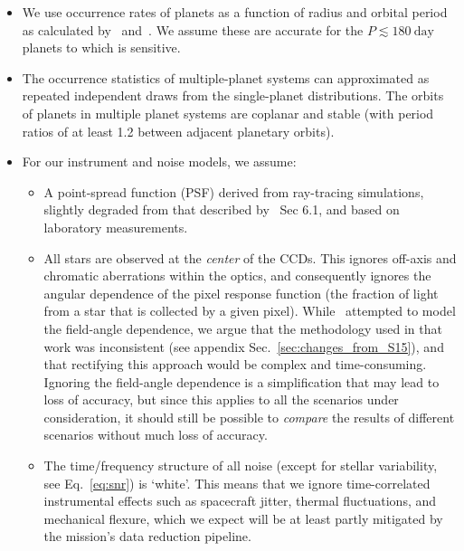 \begin{itemize}
	\item We use occurrence rates of planets as a function of radius
          and orbital period as calculated by~\citet{fressin_false_2013}
          and~\citet{dressing_occurrence_2015}.
          We assume these are accurate for the 
          $P \lesssim 180\ \text{day}$ planets to which \tess is 
          sensitive.
          
	\item The occurrence statistics of multiple-planet systems can
          approximated as repeated independent draws from the
          single-planet distributions. The orbits of planets in
          multiple planet systems are coplanar and stable (with period
          ratios of at least 1.2 between adjacent planetary orbits).
          
	\item For our instrument and noise models, we assume:
	  \begin{itemize}
            
	  \item A point-spread function (PSF) derived from ray-tracing
            simulations, slightly degraded from that described
            by~ Sec 6.1, and based on 
            laboratory measurements.
            
          \item All stars are observed at the \textit{center} of the
            \tess CCDs. This ignores off-axis and chromatic
            aberrations within the \tess optics, and consequently
            ignores the angular dependence of the pixel response
            function (the fraction of light from a star that is
            collected by a given pixel).
            While~ attempted to model the
            field-angle dependence, we argue that the methodology used
            in that work was inconsistent (see appendix
            Sec.~\ref{sec:changes_from_S15}), and that rectifying this
            approach would be complex and time-consuming. Ignoring the
            field-angle dependence is a simplification that may lead
            to loss of accuracy, but since this applies to all the
            scenarios under consideration, it should still be possible
            to {\it compare} the results of different scenarios
            without much loss of accuracy.
            
         \item The time/frequency structure of all noise (except for
           stellar variability, see Eq.~\ref{eq:snr}) is `white'.  
           This means that we ignore time-correlated instrumental effects 
           such as spacecraft jitter, thermal fluctuations, and mechanical
           flexure, which we expect will be at least partly mitigated
           by the mission's data reduction pipeline.
                  

\end{itemize}
\end{itemize}

